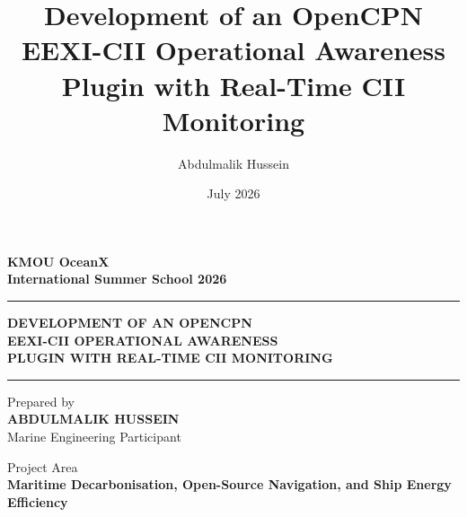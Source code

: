 \documentclass[12pt, a4paper]{report}
\begin{document}
\title{Development of an OpenCPN EEXI-CII Operational Awareness Plugin with Real-Time CII Monitoring}
\author{Abdulmalik Hussein}
\date{July 2026}

\hypersetup{pageanchor=false}
\begin{titlepage}
\thispagestyle{empty}
\begin{center}

{
\vspace*{0.7cm}

{\Large \textbf{KMOU OceanX \\ International Summer School 2026}}\\[0.3cm]

\vspace{5.0cm}

\hrule
\vspace{0.45cm}

{\Large \textbf{DEVELOPMENT OF AN OPENCPN}}\\[0.12cm]
{\Large \textbf{EEXI-CII OPERATIONAL AWARENESS}}\\[0.12cm]
{\Large \textbf{PLUGIN WITH REAL-TIME CII MONITORING}}

\vspace{0.45cm}
\hrule
\vspace{1.0cm}

{\normalsize Prepared by}\\[0.25cm]
{\large \textbf{ABDULMALIK HUSSEIN}}\\[0.1cm]
{\normalsize Marine Engineering Participant}\\[0.1cm]

\vspace{2.0cm}

{\normalsize Project Area}\\[0.2cm]
{\large \textbf{Maritime Decarbonisation, Open-Source Navigation, and Ship Energy Efficiency}}\\[1.5cm]


}
\end{center}
\end{titlepage}
\end{document}
